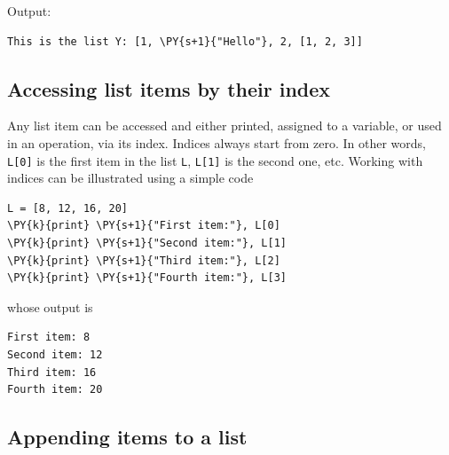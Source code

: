 \noindent
Output:\\

\begin{ybox}
\begin{Verbatim}[commandchars=\\\{\}]
This is the list Y: [1, \PY{s+1}{"Hello"}, 2, [1, 2, 3]]
\end{Verbatim}
\end{ybox}
\vspace{6mm}

\subsection[\ \ Accessing list items by their index]{Accessing list items by their index}

\noindent
Any list item can be accessed and either printed, assigned 
to a variable, or used in an operation, via its index. Indices 
always start from zero. In other words, {\tt L[0]} is the 
first item in the list {\tt L}, {\tt L[1]} is the second one, etc. 
Working with indices can be illustrated using a simple code\\

\begin{bbox}
\begin{Verbatim}[commandchars=\\\{\}]
L = [8, 12, 16, 20]
\PY{k}{print} \PY{s+1}{"First item:"}, L[0]
\PY{k}{print} \PY{s+1}{"Second item:"}, L[1]
\PY{k}{print} \PY{s+1}{"Third item:"}, L[2]
\PY{k}{print} \PY{s+1}{"Fourth item:"}, L[3]
\end{Verbatim}
\end{bbox}
\vspace{6mm}

\noindent
whose output is\\

\begin{ybox}
\begin{Verbatim}[commandchars=\\\{\}]
First item: 8
Second item: 12
Third item: 16
Fourth item: 20
\end{Verbatim}
\end{ybox}
\vspace{6mm}

\subsection[\ \ Appending items to a list]{Appending items to a list}

